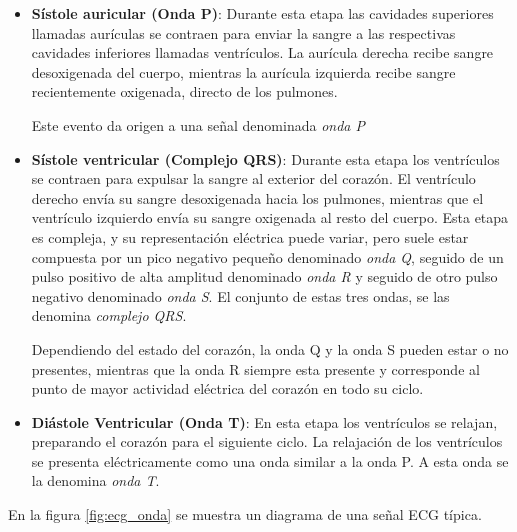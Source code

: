 \documentclass[conference]{IEEEtran}
\begin{document}
\begin{itemize}
    \item \textbf{Sístole auricular (Onda P)}:
        Durante esta etapa las cavidades superiores llamadas aurículas se
        contraen para enviar la sangre a las respectivas cavidades inferiores
        llamadas ventrículos.
        La aurícula derecha recibe sangre desoxigenada del cuerpo, mientras la
        aurícula izquierda recibe sangre recientemente oxigenada, directo de los
        pulmones.

        Este evento da origen a una señal denominada \textit{onda P}

    \item \textbf{Sístole ventricular (Complejo QRS)}:
        Durante esta etapa los ventrículos se contraen para expulsar la sangre
        al exterior del corazón. El ventrículo derecho envía su sangre
        desoxigenada hacia los pulmones, mientras que el ventrículo izquierdo
        envía su sangre oxigenada al resto del cuerpo.
        Esta etapa es compleja, y su representación eléctrica puede variar, pero
        suele estar compuesta por un pico negativo pequeño denominado
        \textit{onda Q}, seguido de un pulso positivo de alta amplitud
        denominado \textit{onda R} y seguido de otro pulso negativo denominado
        \textit{onda S}. El conjunto de estas tres ondas, se las denomina
        \textit{complejo QRS}.
        
        Dependiendo del estado del corazón, la onda Q y la onda S pueden estar o
        no presentes, mientras que la onda R siempre esta presente y corresponde
        al punto de mayor actividad eléctrica del corazón en todo su ciclo.

    \item \textbf{Diástole Ventricular (Onda T)}:
        En esta etapa los ventrículos se relajan, preparando el corazón para el
        siguiente ciclo. La relajación de los ventrículos se presenta
        eléctricamente como una onda similar a la onda P. A esta onda se la
        denomina \textit{onda T}.

\end{itemize}

En la figura \ref{fig:ecg_onda} se muestra un diagrama de una señal ECG típica.
\end{document}
